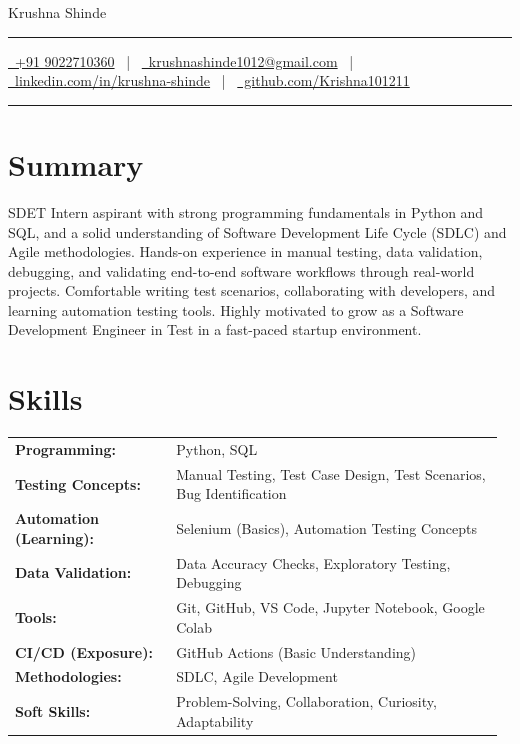 \documentclass[letterpaper,10pt]{article}
\newcommand{\documentTitle}[2]{
  \begin{center}
    {\Huge\color{accentTitle} #1}\\[6pt]
    {\color{accentLine}\hrule}\vspace{2pt}
    {\footnotesize #2}\par\vspace{2pt}
    {\color{accentLine}\hrule}
  \end{center}
}
\begin{document}
\documentTitle{Krushna Shinde}{
  \href{tel:+919022710360}{\faPhone\ +91 9022710360} ~|~
  \href{mailto:krushnashinde1012@gmail.com}{\faEnvelope\ krushnashinde1012@gmail.com} ~|~
  \href{https://www.linkedin.com/in/krushna-shinde-549165276/}{\faLinkedin\ linkedin.com/in/krushna-shinde} ~|~
  \href{https://github.com/Krishna101211}{\faGithub\ github.com/Krishna101211}
}

\section*{Summary}
SDET Intern aspirant with strong programming fundamentals in Python and SQL, and a solid understanding of Software Development Life Cycle (SDLC) and Agile methodologies. Hands-on experience in manual testing, data validation, debugging, and validating end-to-end software workflows through real-world projects. Comfortable writing test scenarios, collaborating with developers, and learning automation testing tools. Highly motivated to grow as a Software Development Engineer in Test in a fast-paced startup environment.

\section*{Skills}
\begin{tabular}{p{0.32\linewidth} p{0.65\linewidth}}
\textbf{Programming:} & Python, SQL \\
\textbf{Testing Concepts:} & Manual Testing, Test Case Design, Test Scenarios, Bug Identification \\
\textbf{Automation (Learning):} & Selenium (Basics), Automation Testing Concepts \\
\textbf{Data Validation:} & Data Accuracy Checks, Exploratory Testing, Debugging \\
\textbf{Tools:} & Git, GitHub, VS Code, Jupyter Notebook, Google Colab \\
\textbf{CI/CD (Exposure):} & GitHub Actions (Basic Understanding) \\
\textbf{Methodologies:} & SDLC, Agile Development \\
\textbf{Soft Skills:} & Problem-Solving, Collaboration, Curiosity, Adaptability \\
\end{tabular}
\end{document}
